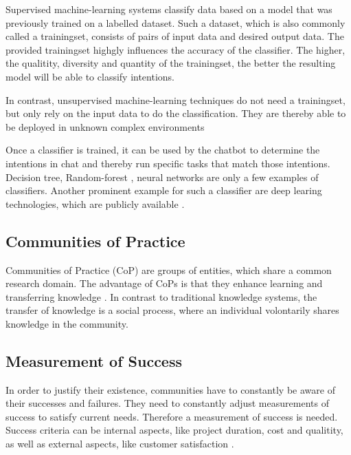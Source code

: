 Supervised machine-learning systems classify data based on a model that was previously trained on a labelled dataset. Such a dataset, which is also commonly called a trainingset, consists of pairs of input data and desired output data. The provided trainingset highgly influences the accuracy of the classifier. The higher, the qualitity, diversity and quantity of the trainingset, the better the resulting model will be able to classify intentions.

In contrast, unsupervised machine-learning techniques do not need a trainingset, but only rely on the input data to do the classification.
They are thereby able to be deployed in unknown complex environments \cite{Adam17}

Once a classifier is trained, it can be used by the chatbot to determine the intentions in chat and thereby run specific tasks that match those intentions.
Decision tree, Random-forest , neural networks are only a few examples of classifiers. Another prominent example for such a classifier are deep learing technologies, which are publicly available \cite{NLKl19}.

\subsection{Communities of Practice}
Communities of Practice (CoP) are groups of entities, which share a common research domain. The advantage of CoPs is that they enhance learning and transferring knowledge \cite{AMMi15}. In contrast to traditional knowledge systems, the transfer of knowledge is a social process, where an individual volontarily shares knowledge in the community.

\subsection{Measurement of Success}
In order to justify their existence, communities have to constantly be aware of their successes and failures. They need to constantly adjust measurements of success to satisfy current needs. Therefore a measurement of success is needed. Success criteria can be internal aspects, like project duration, cost and qualitity, as well as external aspects, like customer satisfaction \cite{AgRa06}.

